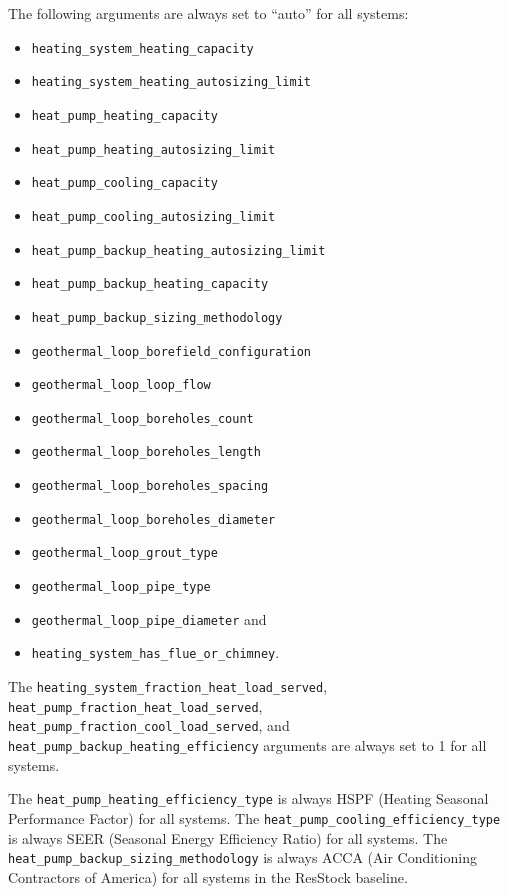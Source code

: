 The following arguments are always set to ``auto'' for all systems:
\begin{itemize}
    \item \texttt{heating\_system\_heating\_capacity} \item\texttt{heating\_system\_heating\_autosizing\_limit}
    \item \texttt{heat\_pump\_heating\_capacity} \item\texttt{heat\_pump\_heating\_autosizing\_limit} 
    \item \texttt{heat\_pump\_cooling\_capacity} \item \texttt{heat\_pump\_cooling\_autosizing\_limit} \item \texttt{heat\_pump\_backup\_heating\_autosizing\_limit}
    \item \texttt{heat\_pump\_backup\_heating\_capacity} \item \texttt{heat\_pump\_backup\_sizing\_methodology} \item \texttt{geothermal\_loop\_borefield\_configuration}
    \item \texttt{geothermal\_loop\_loop\_flow}
    \item \texttt{geothermal\_loop\_boreholes\_count} \item \texttt{geothermal\_loop\_boreholes\_length} \item \texttt{geothermal\_loop\_boreholes\_spacing} \item \texttt{geothermal\_loop\_boreholes\_diameter} \item \texttt{geothermal\_loop\_grout\_type} \item \texttt{geothermal\_loop\_pipe\_type}
    \item \texttt{geothermal\_loop\_pipe\_diameter} and \item \texttt{heating\_system\_has\_flue\_or\_chimney}. 
\end{itemize}

The \texttt{heating\_system\_fraction\_heat\_load\_served}, \texttt{heat\_pump\_fraction\_heat\_load\_served}, \texttt{heat\_pump\_fraction\_cool\_load\_served}, and \texttt{heat\_pump\_backup\_heating\_efficiency} arguments are always set to 1 for all systems. 

The \texttt{heat\_pump\_heating\_efficiency\_type} is always HSPF (Heating Seasonal Performance Factor) for all systems. The \texttt{heat\_pump\_cooling\_efficiency\_type} is always SEER (Seasonal Energy Efficiency Ratio) for all systems.
The \texttt{heat\_pump\_backup\_sizing\_methodology} is always ACCA (Air Conditioning
Contractors of America) for all systems in the ResStock baseline.

